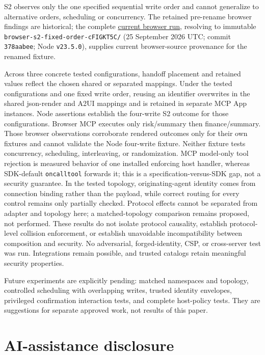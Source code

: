 \documentclass[11pt]{article}
\begin{document}
S2 observes only the one specified sequential write order and cannot
generalize to alternative orders, scheduling or concurrency. The
retained pre-rename browser findings are historical; the complete
\href{./evidence/current-browser-run/}{current browser run}, resolving
to immutable \texttt{browser-s2-fixed-order-cFIGKT5C/} (25 September
2026 UTC; commit \texttt{378aabee}; Node \texttt{v23.5.0}), supplies
current browser-source provenance for the renamed fixture.

Across three concrete tested configurations, handoff placement and
retained values reflect the chosen shared or separated mappings. Under
the tested configurations and one fixed write order, reusing an
identifier overwrites in the shared json-render and A2UI mappings and is
retained in separate MCP App instances. Node assertions establish the
four-write S2 outcome for those configurations. Browser MCP executes
only risk/summary then finance/summary. Those browser observations
corroborate rendered outcomes only for their own fixtures and cannot
validate the Node four-write fixture. Neither fixture tests concurrency,
scheduling, interleaving, or randomization. MCP model-only tool
rejection is measured behavior of one installed enforcing host handler,
whereas SDK-default \texttt{oncalltool} forwards it; this is a
specification-versus-SDK gap, not a security guarantee. In the tested
topology, originating-agent identity comes from connection binding
rather than the payload, while correct routing for every control remains
only partially checked. Protocol effects cannot be separated from
adapter and topology here; a matched-topology comparison remains
proposed, not performed. These results do not isolate protocol
causality, establish protocol-level collision enforcement, or establish
unavoidable incompatibility between composition and security. No
adversarial, forged-identity, CSP, or cross-server test was run.
Integrations remain possible, and trusted catalogs retain meaningful
security properties.

Future experiments are explicitly pending: matched namespaces and
topology, controlled scheduling with overlapping writes, trusted
identity envelopes, privileged confirmation interaction tests, and
complete host-policy tests. They are suggestions for separate approved
work, not results of this paper.

\section{AI-assistance disclosure}\label{ai-assistance-disclosure}
\end{document}
